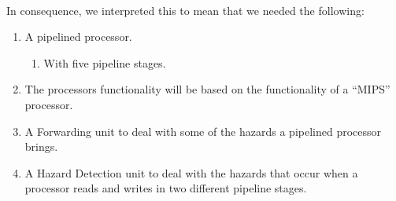 \paragraph*{}
In consequence, we interpreted this to mean that we needed the following:
\begin{enumerate}
	\item A pipelined processor.
	\begin{enumerate}
		\item With five pipeline stages.
	\end{enumerate}
	\item The processors functionality will be based on the functionality of a
``MIPS'' processor.
	\item A Forwarding unit to deal with some of the hazards a pipelined
processor brings.
	\item A Hazard Detection unit to deal with the hazards that occur when a
processor reads and writes in two different pipeline stages.
\end{enumerate}
